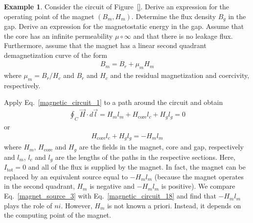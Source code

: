 \documentclass[11pt,a4paper,oneside]{book}
\numberwithin{equation}{section}
\theoremstyle{it}
\theoremstyle{definition}
\newtheorem{example}{Example}[section]
\begin{document}
\begin{example}
	Consider the circuit of Figure~\ref{}. Derive an expression for the operating point of the magnet $(B_m,H_m)$. Determine the flux density $B_g$ in the gap. Derive an expression for the magnetostatic energy in the gap. Assume that the core has an infinite permeability $\mu\circ\infty$ and that there is no leakage flux. Furthermore, assume that the magnet has a linear second quadrant demagnetization curve of the form
\begin{equation}\label{magnet_source_1}
	{\begin{aligned}
		B_m = B_r+\mu_m H_m
	\end{aligned}}
\end{equation}
where $\mu_m=B_r/H_c$ and $B_r$ and $H_c$ and the residual magnetization and coercivity, respectively.

Apply Eq.~\eqref{magnetic_circuit_1} to a path around the circuit and obtain 
\begin{equation}\label{magnet_source_2}
	{\begin{aligned}
	\oint_{C}\vec{H}\cdot d\vec{l}=H_ml_m+H_\text{core}l_c+H_gl_g=0
	\end{aligned}}
\end{equation}
or 
\begin{equation}\label{magnet_source_3}
	{\begin{aligned}
		H_\text{core}l_c+H_gl_g=-H_ml_m
	\end{aligned}}
\end{equation}
where $H_m$, $H_\text{core}$ and $H_g$ are the fields in the magnet, core and gap, respectively and $l_m$, $l_c$ and $l_g$ are the lengths of the paths in the respective sections. Here, $I_\text{tot}=0$ and all of the flux is supplied by the magnet. In fact, the magnet can be replaced by an equivalent source equal to $-H_ml_m$ (because the magnet operates in the second quadrant, $H_m$ is negative and $-H_ml_m$ is positive).  We compare Eq.~\eqref{magnet_source_3} with Eq.~\eqref{magnetic_circuit_18} and find that $-H_ml_m$ plays the role of $ni$. However, $H_m$ is not known a priori. Instead, it depends on the computing point of the magnet.


\end{example}
\end{document}
